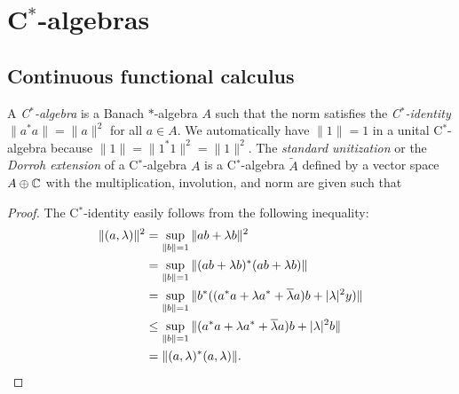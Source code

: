 \documentclass{../../large}
\begin{document}
\begin{prb}
\end{prb}







\chapter{C$^*$-algebras}

\section{Continuous functional calculus}

\begin{prb}[C$^*$-algerbas]
A \emph{C$^*$-algebra} is a Banach $*$-algebra $A$ such that the norm satisfies the \emph{C$^*$-identity} $\|a^*a\|=\|a\|^2$ for all $a\in A$.
We automatically have $\|1\|=1$ in a unital C$^*$-algebra because $\|1\|=\|1^*1\|^2=\|1\|^2$.
The \emph{standard unitization} or the \emph{Dorroh extension} of a C$^*$-algebra $A$ is a C$^*$-algebra $\tilde A$ defined by a vector space $A\oplus\C$ with the multiplication, involution, and norm are given such that
\begin{parts}
\item
\end{parts}
\end{prb}
\begin{proof}
The C$^*$-identity easily follows from the following inequality:
\begin{align*}
\|(a,\lambda)\|^2&=\sup_{\|b\|=1}\|ab+\lambda b\|^2\\
&=\sup_{\|b\|=1}\|(ab+\lambda b)^*(ab+\lambda b)\|\\
&=\sup_{\|b\|=1}\|b^*((a^*a+\lambda a^*+\bar\lambda a)b+|\lambda|^2y)\|\\
&\le\sup_{\|b\|=1}\|(a^*a+\lambda a^*+\bar\lambda a)b+|\lambda|^2b\|\\
&=\|(a,\lambda)^*(a,\lambda)\|.\qedhere
\end{align*}
\end{proof}
\end{document}

